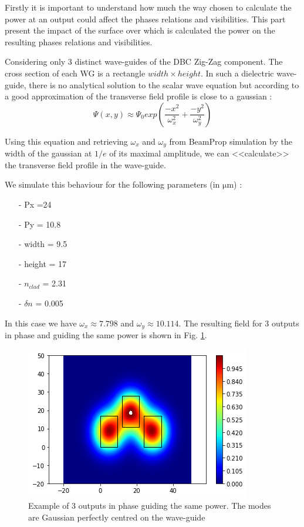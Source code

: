  
Firstly it is important to understand how much the way chosen to calculate the power at an output could affect the phases relations and visibilities. This part present the impact of the surface over which is calculated the power on the resulting phases relations and visibilities.

Considering  only 3 distinct wave-guides of the DBC Zig-Zag component. The cross section of each WG is a rectangle $width \times height$. In such a dielectric wave-guide, there is no analytical solution to the scalar wave equation but according to \cite{labeye} a good approximation of the transverse field profile is close to a gaussian :
$$
\Psi(x,y) \approx \Psi_0 exp\left( \frac{-x^2}{\omega_x^2} + \frac{-y^2}{\omega_y^2}\right)
$$

Using this equation and retrieving $\omega_x$ and $\omega_y$ from BeamProp simulation by the width of the gaussian at $1/e$ of its maximal amplitude, we can <<calculate>> the transverse field profile in the wave-guide.

We simulate this behaviour for the following parameters (in $\si{\micro\meter}$) :
\begin{itemize}
    \setlength\itemsep{0pt}
\item[-] Px =24
\item[-] Py = 10.8
\item[-] width = 9.5
\item[-] height = 17
\item[-] $n_{clad}$ = 2.31
\item[-] $\delta n$ = 0.005
\end{itemize}
In this case we have $\omega_x \approx 7.798$ and $\omega_y \approx
10.114$. The resulting field for 3 outputs in phase and guiding the same
power is shown in Fig. \ref{fig:3gauss}.

\begin{figure}[htbp]
  \centering
  \includegraphics[scale=.5]{picture/integrating_area/3gauss.png}
  \caption{Example of 3 outputs in phase guiding the same power. The modes are Gaussian perfectly centred on the wave-guide}
  \label{fig:3gauss}
\end{figure}

